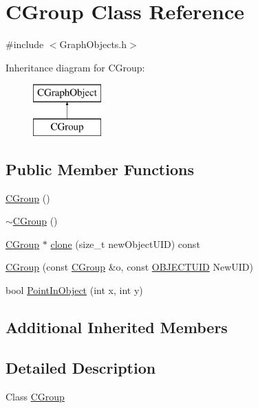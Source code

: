 \hypertarget{class_c_group}{}\section{C\+Group Class Reference}
\label{class_c_group}


{\ttfamily \#include $<$Graph\+Objects.\+h$>$}

Inheritance diagram for C\+Group\+:\begin{figure}[H]
\begin{center}
\leavevmode
\includegraphics[height=2.000000cm]{class_c_group}
\end{center}
\end{figure}
\subsection*{Public Member Functions}
\begin{DoxyCompactItemize}
\item 
\hyperlink{class_c_group_afa02cd1c3bb9c8d1d250e345c8ec8051}{C\+Group} ()
\item 
\hyperlink{class_c_group_a0794e178de78a34a96ec98d2983fea5d}{$\sim$\+C\+Group} ()
\item 
\hyperlink{class_c_group}{C\+Group} $\ast$ \hyperlink{class_c_group_a618ba91fd461bc8ee0706766ba9f0e77}{clone} (size\+\_\+t new\+Object\+U\+I\+D) const 
\item 
\hyperlink{class_c_group_a64852e4e091d511cb07dcc480ac6edb4}{C\+Group} (const \hyperlink{class_c_group}{C\+Group} \&o, const \hyperlink{_object_database_defines_8h_a164ec120b01429b93c9cd0bef2a67e64}{O\+B\+J\+E\+C\+T\+U\+I\+D} New\+U\+I\+D)
\item 
bool \hyperlink{class_c_group_a5b3284dd8f03992650a5c18d293a965d}{Point\+In\+Object} (int x, int y)
\end{DoxyCompactItemize}
\subsection*{Additional Inherited Members}


\subsection{Detailed Description}
Class \hyperlink{class_c_group}{C\+Group} 

